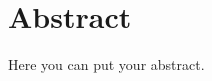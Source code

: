 \chapter*{Abstract} %

\begin{justify}
\small
{}

Here you can put your abstract. 
\blindtext

\blindtext

\end{justify}


